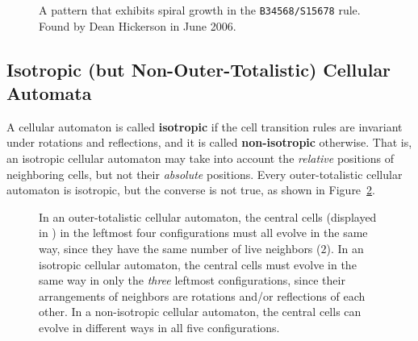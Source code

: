 \begin{figure}[!htb]
	\centering
	\caption{A pattern that exhibits spiral growth in the \texttt{B34568/S15678} rule. Found by Dean Hickerson in June 2006.}\label{fig:spiral_growth_elementary}
\end{figure}


\subsection{Isotropic (but Non-Outer-Totalistic) Cellular Automata}\label{sec:isotropic_rules}

A cellular automaton is called \textbf{isotropic} if the cell transition rules are invariant under rotations and reflections, and it is called \textbf{non-isotropic} otherwise. That is, an isotropic cellular automaton may take into account the \emph{relative} positions of neighboring cells, but not their \emph{absolute} positions. Every outer-totalistic cellular automaton is isotropic, but the converse is not true, as shown in Figure~\ref{fig:isotropic_neighborhoods}.

\begin{figure}[!htb]
	\centering
	\caption{In an outer-totalistic cellular automaton, the central cells (displayed in ) in the leftmost four configurations must all evolve in the same way, since they have the same number of live neighbors ($2$). In an isotropic cellular automaton, the central cells must evolve in the same way in only the \emph{three} leftmost configurations, since their arrangements of neighbors are rotations and/or reflections of each other. In a non-isotropic cellular automaton, the central cells can evolve in different ways in all five configurations.}\label{fig:isotropic_neighborhoods}
\end{figure}


